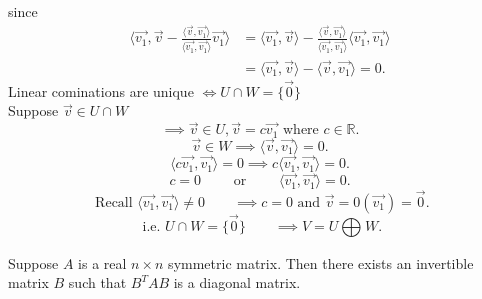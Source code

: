 \documentclass{report}
\begin{document}
{         since 
         \begin{align*}
          \langle \vec{ v_1} ,\vec{ v} - \frac{ \langle \vec{ v} , \vec{ v_1}   \rangle   }{ \langle \vec{ v_1} , \vec{ v_1}   \rangle   } \vec{ v_1}   \rangle &= \langle \vec{ v_1} ,\vec{ v}   \rangle - \frac{ \langle \vec{ v} , \vec{ v_1}   \rangle   }{ \langle \vec{ v_1} , \vec{ v_1}   \rangle   }  \langle \vec{ v_1} ,\vec{ v_1}   \rangle  \\
          &= \langle \vec{ v_1} ,\vec{ v}   \rangle - \langle \vec{ v} , \vec{ v_1}   \rangle =0
         .\end{align*}
         Linear cominations are unique $  \iff U \cap W = \{ \vec{ 0} \}$ \\
         Suppose $ \vec{ v} \in U \cap  W$
         \[
         \implies \vec{ v} \in U, \vec{ v} = c \vec{ v_1} \text{ where } c \in \mathbb{R}
         .\] 
         \[
         \vec{ v} \in W \implies \langle \vec{ v} , \vec{ v_1}   \rangle =0
         .\] 
         \[
         \langle c \vec{ v_1} , \vec{ v_1}   \rangle =0 \implies c \langle \vec{ v_1} , \vec{ v_1}   \rangle =0
         .\] 
         \[
         c=0 \qquad  \text{ or } \qquad  \langle \vec{ v_1} , \vec{ v_1}   \rangle =0
         .\] 
         \[
         \text{ Recall } \langle \vec{ v_1} , \vec{ v_1}   \rangle \neq 0 \qquad  \implies c=0 \text{ and } \vec{ v} = 0 \left( \vec{ v_1}  \right) = \vec{ 0} 
         .\] 
         \[
         \text{ i.e.  } U \cap W = \{ \vec{ 0} \} \qquad  \implies V = U \bigoplus_{} W
         .\] 
         
         }

 
         \thm{}
         {
         Suppose $ A$ is a real $n \times n$  symmetric matrix. Then there exists an invertible matrix $ B$ such that $ B ^{T}A B$ is a diagonal matrix.\\
         }
\end{document}
